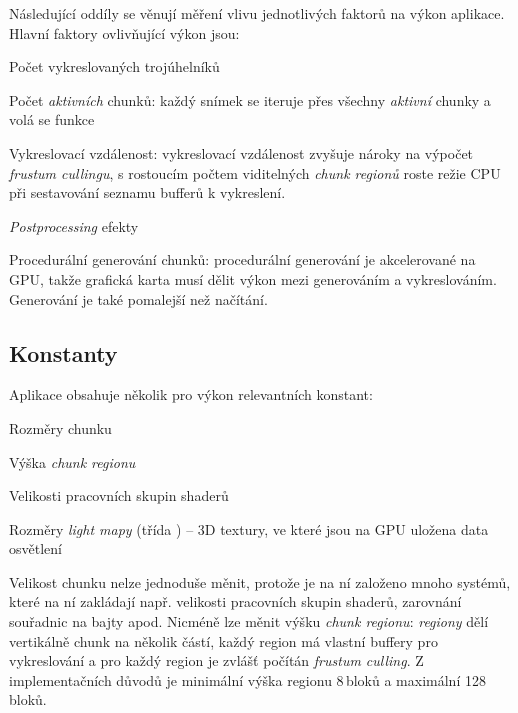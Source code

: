 \noindent Následující oddíly se věnují měření vlivu jednotlivých faktorů na výkon aplikace. Hlavní faktory ovlivňující výkon jsou:
\begin{compactenum}
	\item Počet vykreslovaných trojúhelníků
	\item Počet \textit{aktivních} chunků: každý snímek se iteruje přes všechny \textit{aktivní} chunky a volá se funkce 
	\item Vykreslovací vzdálenost: vykreslovací vzdálenost zvyšuje nároky na výpočet \textit{frustum cullingu}, s rostoucím počtem viditelných \textit{chunk regionů} roste režie CPU při sestavování seznamu bufferů k vykreslení.
	\item \textit{Postprocessing} efekty
	\item Procedurální generování chunků: procedurální generování je akcelerované na GPU, takže grafická karta musí dělit výkon mezi generováním a vykreslováním. Generování je také pomalejší než načítání.
\end{compactenum}

\pagebreak
\subsection{Konstanty}
Aplikace obsahuje několik pro výkon relevantních konstant:
\begin{compactenum}
	\item Rozměry chunku
	\item Výška \textit{chunk regionu}
	\item Velikosti pracovních skupin shaderů
	\item Rozměry \textit{light mapy} (třída ) -- 3D textury, ve které jsou na GPU uložena data osvětlení
\end{compactenum}
\vspace{2mm}

Velikost chunku nelze jednoduše měnit, protože je na ní založeno mnoho systémů, které na ní zakládají např. velikosti pracovních skupin shaderů, zarovnání souřadnic na bajty apod. Nicméně lze měnit výšku \textit{chunk regionu}: \textit{regiony} dělí vertikálně chunk na několik částí, každý region má vlastní buffery pro vykreslování a pro každý region je zvlášť počítán \textit{frustum culling}. Z implementačních důvodů je minimální výška regionu 8\,bloků a maximální 128\,bloků.

